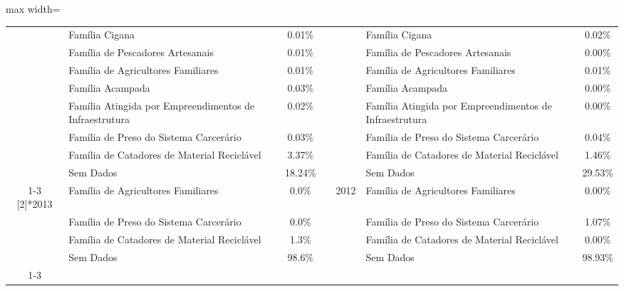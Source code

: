 \documentclass[14pt]{extarticle}
\begin{document}
\begin{table}[htbp]
\begin{adjustbox}{max width=\linewidth}
\begin{tabular}{clcrclc}
         & Família Cigana & 0.01\% &      &      & Família Cigana & 0.02\% \\
         & Família de Pescadores Artesanais & 0.01\% &      &      & Família de Pescadores Artesanais & 0.00\% \\
         & Família de Agricultores Familiares & 0.01\% &      &      & Família de Agricultores Familiares & 0.01\% \\
         & Família Acampada & 0.03\% &      &      & Família Acampada & 0.00\% \\
         & Família Atingida por Empreendimentos de Infraestrutura & 0.02\% &      &      & Família Atingida por Empreendimentos de Infraestrutura & 0.00\% \\
         & Família de Preso do Sistema Carcerário & 0.03\% &      &      & Família de Preso do Sistema Carcerário & 0.04\% \\
         & Família de Catadores de Material Reciclável & 3.37\% &      &      & Família de Catadores de Material Reciclável & 1.46\% \\
         & Sem Dados & 18.24\% &      &      & Sem Dados & 29.53\% \\
\cmidrule{1-3}\cmidrule{5-7}    \multirow{4}[2]{*}{2013} & Família de Agricultores Familiares & 0.0\% &      & \multirow{4}[2]{*}{2012} & Família de Agricultores Familiares & 0.00\% \\
         & Família de Preso do Sistema Carcerário & 0.0\% &      &      & Família de Preso do Sistema Carcerário & 1.07\% \\
         & Família de Catadores de Material Reciclável & 1.3\% &      &      & Família de Catadores de Material Reciclável & 0.00\% \\
         & Sem Dados & 98.6\% &      &      & Sem Dados & 98.93\% \\
\cmidrule{1-3}\cmidrule{5-7}    
\end{tabular}%
\end{adjustbox}
  \label{tab:tab_gte_perc}%
\end{table}%

\end{document}
